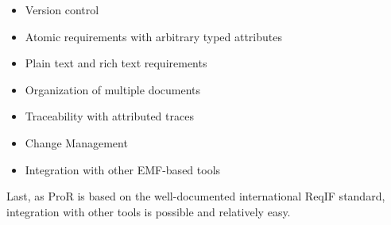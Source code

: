 \documentclass{template/openetcs_report}
\begin{document}
\begin{itemize}
\item Version control
\item Atomic requirements with arbitrary typed attributes
\item Plain text and rich text requirements
\item Organization of multiple documents
\item Traceability with attributed traces
\item Change Management
\item Integration with other EMF-based tools
\end{itemize}

Last, as ProR is based on the well-documented international ReqIF standard, integration with other tools is possible and relatively easy.





\appendix




\end{document}
